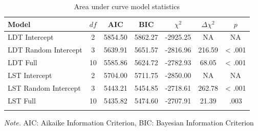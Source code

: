 \documentclass[english,man]{apa6}
\theoremstyle{definition}
\theoremstyle{definition}
\theoremstyle{definition}
\theoremstyle{remark}
\begin{document}
\begin{table}[tbp]
\begin{center}
\begin{threeparttable}
\caption{\label{tab:area-table-model}Area under curve model statistics}
\begin{tabular}{lcccccc}
\toprule
Model & $df$ & AIC & BIC & $\chi^2$ & $\Delta\chi^2$ & $p$\\
\midrule
LDT Intercept & 2 & 5854.50 & 5862.27 & -2925.25 & NA & NA\\
LDT Random Intercept & 3 & 5639.91 & 5651.57 & -2816.96 & 216.59 & < .001\\
LDT Full & 10 & 5585.86 & 5624.72 & -2782.93 & 68.05 & < .001\\
LST Intercept & 2 & 5704.00 & 5711.75 & -2850.00 & NA & NA\\
LST Random Intercept & 3 & 5443.21 & 5454.85 & -2718.61 & 262.78 & < .001\\
LST Full & 10 & 5435.82 & 5474.60 & -2707.91 & 21.39 & .003\\
\bottomrule
\addlinespace
\end{tabular}
\begin{tablenotes}[para]
\textit{Note.} AIC: Aikaike Information Criterion, BIC: Bayesian Information Criterion
\end{tablenotes}
\end{threeparttable}
\end{center}
\end{table}
\end{document}
